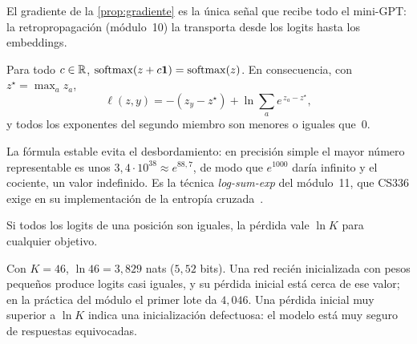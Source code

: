 \addtocounter{definicion}{1}%

El gradiente de la \cref{prop:gradiente} es la única señal que recibe todo el mini-GPT: la retropropagación (módulo~10) la transporta desde los logits hasta los embeddings.

\begin{proposicion}\label{prop:traslacion}
Para todo $c\in\mathbb{R}$, $\operatorname{softmax}(z+c\mathbf 1)=\operatorname{softmax}(z)$. En consecuencia, con $z^{\star}=\max_a z_a$,
\[
\ell(z,y)=-(z_y-z^{\star})+\ln\sum_{a}e^{\,z_a-z^{\star}},
\]
y todos los exponentes del segundo miembro son menores o iguales que~0.
\end{proposicion}

La fórmula estable evita el desbordamiento: en precisión simple el mayor número representable es unos $3{,}4\cdot 10^{38}\approx e^{88{,}7}$, de modo que $e^{1000}$ daría infinito y el cociente, un valor indefinido. Es la técnica \emph{log-sum-exp} del módulo~11, que CS336 exige en su implementación de la entropía cruzada~\cite[§4.1]{cs336}.

\begin{proposicion}\label{prop:lnK}
Si todos los logits de una posición son iguales, la pérdida vale $\ln K$ para cualquier objetivo.
\end{proposicion}

Con $K=46$, $\ln 46=3{,}829$ nats ($5{,}52$ bits). Una red recién inicializada con pesos pequeños produce logits casi iguales, y su pérdida inicial está cerca de ese valor; en la práctica del módulo el primer lote da $4{,}046$. Una pérdida inicial muy superior a $\ln K$ indica una inicialización defectuosa: el modelo está muy seguro de respuestas equivocadas.

